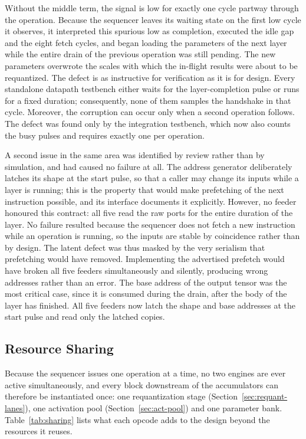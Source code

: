 Without the middle term, the signal is low for exactly one cycle partway through
the operation. Because the sequencer leaves its waiting state on the first low
cycle it observes, it interpreted this spurious low as completion, executed the
idle gap and the eight fetch cycles, and began loading the parameters of the
next layer while the entire drain of the previous operation was still pending.
The new parameters overwrote the scales with which the in-flight results were
about to be requantized. The defect is as instructive for verification as it is
for design. Every standalone datapath testbench either waits for the
layer-completion pulse or runs for a fixed duration; consequently, none of them
samples the handshake in that cycle. Moreover, the corruption can occur only
when a second operation follows. The defect was found only by the integration
testbench, which now also counts the busy pulses and requires exactly one per
operation.

A second issue in the same area was identified by review rather than by
simulation, and had caused no failure at all. The address generator deliberately
latches its shape at the start pulse, so that a caller may change its inputs
while a layer is running; this is the property that would make prefetching of
the next instruction possible, and its interface documents it explicitly.
However, no feeder honoured this contract: all five read the raw ports for the
entire duration of the layer. No failure resulted because the sequencer does not
fetch a new instruction while an operation is running, so the inputs are stable
by coincidence rather than by design. The latent defect was thus masked by the
very serialism that prefetching would have removed. Implementing the advertised
prefetch would have broken all five feeders simultaneously and silently,
producing wrong addresses rather than an error. The base address of the output
tensor was the most critical case, since it is consumed during the drain, after
the body of the layer has finished. All five feeders now latch the shape and
base addresses at the start pulse and read only the latched copies.

\subsection{Resource Sharing}
\label{sec:sharing}

Because the sequencer issues one operation at a time, no two engines are ever
active simultaneously, and every block downstream of the accumulators can
therefore be instantiated once: one requantization stage
(Section~\ref{sec:requant-lanes}), one activation pool
(Section~\ref{sec:act-pool}) and one parameter bank. Table~\ref{tab:sharing}
lists what each opcode adds to the design beyond the resources it reuses.

